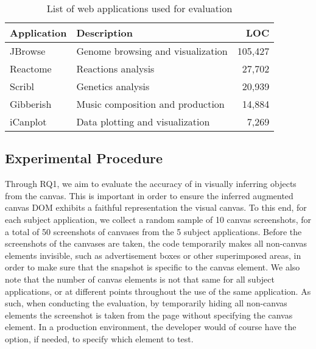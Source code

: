 \begin{table}[b]
\setlength{\tabcolsep}{6pt}
\renewcommand{\arraystretch}{0.9}
\centering
\caption{List of web applications used for evaluation}
\begin{tabular}{llr}
\toprule
\textbf{Application} &  \textbf{Description}  &  \textbf{LOC}  \\
\midrule
JBrowse~\cite{eval_app_jbrowse} & Genome browsing and visualization & 105,427 \\
Reactome~\cite{eval_app_reactome} & Reactions analysis & 27,702 \\
Scribl~\cite{eval_app_scribl} & Genetics analysis & 20,939 \\
Gibberish~\cite{eval_app_gibberish} & Music composition and production & 14,884 \\
iCanplot~\cite{eval_app_icanplot} & Data plotting and visualization & 7,269 \\


\bottomrule
\end{tabular}
\label{table:eval-apps}
\end{table}

\subsection{Experimental Procedure}
\label{sec:experimental-procedure}
Through RQ1, we aim to evaluate the accuracy of \tool in visually inferring objects from the canvas. This is important in order to ensure  the inferred augmented canvas DOM exhibits a faithful representation the visual canvas.
To this end, for each subject application, we collect a random sample of 10 canvas screenshots, for a total of 50 screenshots of canvases from the 5 subject applications. Before the screenshots of the canvases are taken, the code temporarily makes all non-canvas elements invisible, such as advertisement boxes or other superimposed areas, in order to make sure that the snapshot is specific to the canvas element. We also note that the number of canvas elements is not that same for all subject applications, or at different points throughout the use of the same application. As such, when conducting the evaluation, by temporarily hiding all non-canvas elements the screenshot is taken from the page without specifying the canvas element. In a production environment, the developer would of course have the option, if needed, to specify which element to test. 

